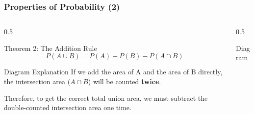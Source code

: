 \begin{frame}
    \frametitle{Properties of Probability (2)}
    \footnotesize
    \begin{columns}[T]
        \begin{column}{0.5\textwidth}
            \begin{block}{Theorem 2: The Addition Rule}
                \[ P(A \cup B) = P(A) + P(B) - P(A \cap B) \]
            \end{block}
            
            \begin{block}{Diagram Explanation}
                If we add the area of A and the area of B directly, the intersection area (\(A \cap B\)) will be counted \textbf{twice}.
                \vspace{0.5cm}
                
                Therefore, to get the correct total union area, we must subtract the double-counted intersection area one time.
            \end{block}
        \end{column}
        
        \begin{column}{0.5\textwidth}
            \begin{block}{Diagram}
                \centering
            \end{block}
        \end{column}
    \end{columns}
\end{frame}

